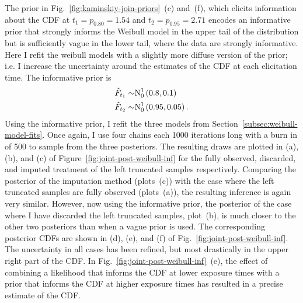 The prior in Fig.~\ref{fig:kaminskiy-join-priors}~(c) and~(f), which elicits information about the CDF at $t_1 = p_{0.80} = 1.54$ and $t_2 = p_{0.95} = 2.71$ encodes an informative prior that strongly informs the Weibull model in the upper tail of the distribution but is sufficiently vague in the lower tail, where the data are strongly informative. Here I refit the weibull models with a slightly more diffuse version of the prior; i.e. I increase the uncertainty around the estimates of the CDF at each elicitation time. The informative prior is
\begin{align*}
    \hat{F}_{t_1} \sim & \hbox{N}^{1}_{0}\left(0.8, 0.1\right)    \\
    \hat{F}_{t_2} \sim & \hbox{N}^{1}_{0}\left(0.95, 0.05\right).
\end{align*}
Using the informative prior, I refit the three models from Section~\ref{subsec:weibull-model-fits}. Once again, I use four chains each 1000 iterations long with a burn in of 500 to sample from the three posteriors. The resulting draws are plotted in (a), (b), and (c) of Figure~\ref{fig:joint-post-weibull-inf} for the fully observed, discarded, and imputed treatment of the left truncated samples respectively. Comparing the posterior of the imputation method (plots~(c)) with the case where the left truncated samples are fully observed (plots~(a)), the resulting inference is again very similar. However, now using the informative prior, the posterior of the case where I have discarded the left truncated samples, plot~(b), is much closer to the other two posteriors than when a vague prior is used. The corresponding posterior CDFs are shown in (d), (e), and (f) of Fig.~\ref{fig:joint-post-weibull-inf}. The uncertainty in all cases has been refined, but most drastically in the upper right part of the CDF. In Fig.~\ref{fig:joint-post-weibull-inf}~(e), the effect of combining a likelihood that informs the CDF at lower exposure times with a prior that informs the CDF at higher exposure times has resulted in a precise estimate of the CDF. 

